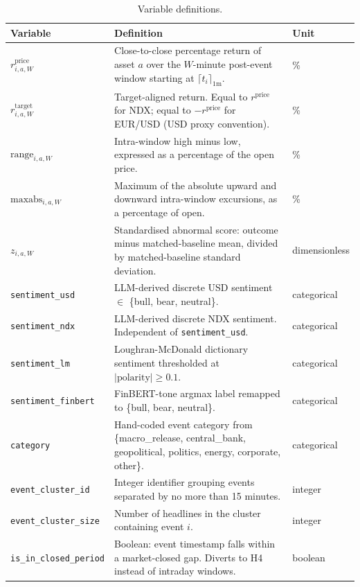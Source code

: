 \begin{table}[!htbp]
\centering
\caption{Variable definitions.}
\label{tab:var-defs}
\begin{threeparttable}
\small
\begin{tabularx}{\textwidth}{lXl}
\toprule
\textbf{Variable} & \textbf{Definition} & \textbf{Unit} \\
\midrule
$r^{\text{price}}_{i,a,W}$ & Close-to-close percentage return of asset $a$ over the $W$-minute post-event window starting at $\lceil t_i \rceil_{1\text{m}}$. & \% \\[2pt]
$r^{\text{target}}_{i,a,W}$ & Target-aligned return. Equal to $r^{\text{price}}$ for NDX; equal to $-r^{\text{price}}$ for EUR/USD (USD proxy convention). & \% \\[2pt]
$\text{range}_{i,a,W}$ & Intra-window high minus low, expressed as a percentage of the open price. & \% \\[2pt]
$\text{maxabs}_{i,a,W}$ & Maximum of the absolute upward and downward intra-window excursions, as a percentage of open. & \% \\[2pt]
$z_{i,a,W}$ & Standardised abnormal score: outcome minus matched-baseline mean, divided by matched-baseline standard deviation. & dimensionless \\[2pt]
\texttt{sentiment\_usd} & LLM-derived discrete USD sentiment $\in$ \{bull, bear, neutral\}. & categorical \\[2pt]
\texttt{sentiment\_ndx} & LLM-derived discrete NDX sentiment. Independent of \texttt{sentiment\_usd}. & categorical \\[2pt]
\texttt{sentiment\_lm} & Loughran-McDonald dictionary sentiment thresholded at $|\text{polarity}| \geq 0.1$. & categorical \\[2pt]
\texttt{sentiment\_finbert} & FinBERT-tone argmax label remapped to \{bull, bear, neutral\}. & categorical \\[2pt]
\texttt{category} & Hand-coded event category from \{macro\_release, central\_bank, geopolitical, politics, energy, corporate, other\}. & categorical \\[2pt]
\texttt{event\_cluster\_id} & Integer identifier grouping events separated by no more than 15 minutes. & integer \\[2pt]
\texttt{event\_cluster\_size} & Number of headlines in the cluster containing event $i$. & integer \\[2pt]
\texttt{is\_in\_closed\_period} & Boolean: event timestamp falls within a market-closed gap. Diverts to H4 instead of intraday windows. & boolean \\[2pt]

\end{tabularx}
\end{threeparttable}
\end{table}
